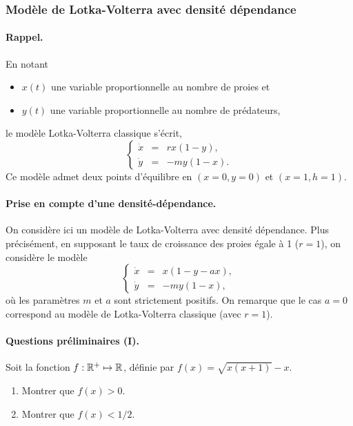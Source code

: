 \subsubsection{Modèle de Lotka-Volterra avec densité dépendance} 

\paragraph{Rappel.}
En notant 
\begin{itemize}
  \item $x(t)$ une variable proportionnelle au nombre de proies et
  \item $y(t)$ une variable proportionnelle au nombre de prédateurs,
\end{itemize}
le modèle Lotka-Volterra classique s'écrit, 
$$
\left\{\begin{array}{rcr}
        \dot x & = & r x (1 - y), \\ 
        \dot y & = & - m y (1 - x).
        \end{array}\right.
$$
Ce modèle admet deux points d'équilibre en $(x=0, y=0)$ et $(x=1, h=1)$.

\paragraph{Prise en compte d'une densité-dépendance.}
On considère ici un modèle de Lotka-Volterra avec densité dépendance. Plus précisément, en supposant le taux de croissance des proies égale à 1 ($r = 1$), on considère le modèle
\begin{equation} \label{eq:LVDD}
\left\{\begin{array}{rcr}
        \dot x & = & x (1 - y - ax), \\ 
        \dot y & = & - m y (1 - x), 
        \end{array}\right.
\end{equation}
où les paramètres $m$ et $a$ sont strictement positifs. On remarque que le cas $a=0$ correspond au modèle de Lotka-Volterra classique (avec $r=1$).

\bigskip
\paragraph{Questions préliminaires (I).}
Soit la fonction $f: \mathbb{R}^+ \mapsto \mathbb{R}$, définie par $f(x) = \sqrt{x(x+1)} - x$.
\begin{enumerate}
  \item Montrer que $f(x) > 0$. \label{q:LVDD-f1}
  \item Montrer que $f(x) < 1/2$. \label{q:LVDD-f2}
\end{enumerate}

